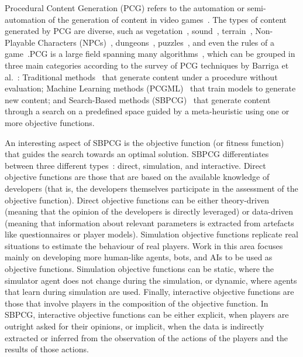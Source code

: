 Procedural Content Generation (PCG) refers to the automation or semi-automation of the generation of content in video games~\cite{hendrikx2013procedural}.  The types of content generated by PCG are diverse, such as vegetation~\cite{mora2021flora}, sound~\cite{plans2012experience}, terrain~\cite{frade2009breeding}, Non-Playable Characters (NPCs)~\cite{viana2022illuminating}, dungeons~\cite{viana2019survey}, puzzles~\cite{de2019procedural}, and even the rules of a game~\cite{browne2008automatic}.PCG is a large field spanning many algorithms~\cite{yannakakis2018artificial}, which can be grouped in three main categories according to the survey of PCG techniques by Barriga et al.~\cite{Barriga2019}: Traditional methods~\cite{freiknecht2017survey} that generate content under a procedure without evaluation; Machine Learning methods (PCGML)~\cite{Summerville2018,liu2021deep,souchleris2023reinforcement} that train models to generate new content; and Search-Based methods (SBPCG)~\cite{hendrikx2013procedural,togelius2011search} that generate content through a search on a predefined space guided by a meta-heuristic using one or more objective functions. 

An interesting aspect of SBPCG is the objective function (or fitness function) that guides the search towards an optimal solution. SBPCG differentiates between three different types~\cite{togelius2011search}: direct, simulation, and interactive. Direct objective functions are those that are based on the available knowledge of developers (that is, the developers themselves participate in the assessment of the objective function). Direct objective functions can be either theory-driven (meaning that the opinion of the developers is directly leveraged) or data-driven (meaning that information about relevant parameters is extracted from artefacts like questionnaires or player models). Simulation objective functions replicate real situations to estimate the behaviour of real players. Work in this area focuses mainly on developing more human-like agents, bots, and AIs to be used as objective functions. Simulation objective functions can be static, where the simulator agent does not change during the simulation, or dynamic, where agents that learn during simulation are used. Finally, interactive objective functions are those that involve players in the composition of the objective function.
In SBPCG, interactive objective functions can be either explicit, when players are outright asked for their opinions, or implicit, when the data is indirectly extracted or inferred from the observation of the actions of the players and the results of those actions.

